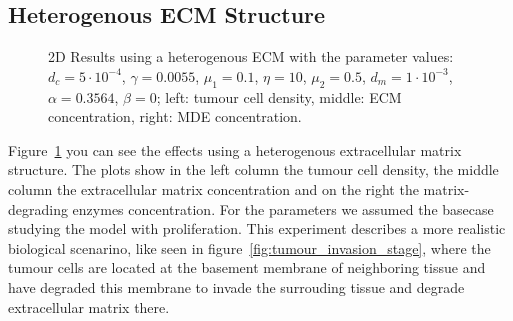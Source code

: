 \subsection{Heterogenous ECM Structure}
\begin{figure}[h]
    \centering
    \caption{2D Results using a heterogenous ECM with the parameter values: $d_c=5\cdot 10^{-4}$, $\gamma=0.0055$, $\mu_1 = 0.1$, $\eta=10$, $\mu_2=0.5$, $d_m = 1\cdot 10^{-3}$, $\alpha = 0.3564$, $\beta = 0$; left: tumour cell density, middle: ECM concentration, right: MDE concentration.}
    \label{fig:2D_heterogenous_ECM}
\end{figure}
Figure~\ref{fig:2D_heterogenous_ECM} you can see the effects using a heterogenous extracellular matrix structure. The plots show in the left column the tumour cell density, the middle column the extracellular matrix concentration and on the right the matrix-degrading enzymes concentration. For the parameters we assumed the basecase studying the model with proliferation. \newline
This experiment describes a more realistic biological scenarino, like seen in figure~\ref{fig:tumour_invasion_stage}, where the tumour cells are located at the basement membrane of neighboring tissue and have degraded this membrane to invade the surrouding tissue and degrade extracellular matrix there.\newline
